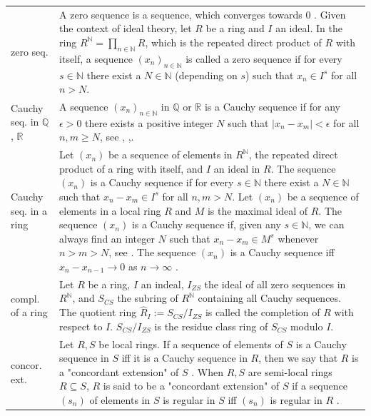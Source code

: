 \documentclass[12pt]{amsart}
\theoremstyle{definition}
\begin{document}
{\renewcommand{\arraystretch}{1.8}
\begin{table}[H]
	\centering
	\begin{tabular}{|P{1.4cm} p{13.4cm}|}
		\hline
		zero seq. & A zero sequence is a sequence, which converges towards $0$ \cite[p.~154]{Ref_Schmidt_2007}. Given the context of ideal theory, let $R$ be a ring and $I$ an ideal. In the ring $R^\mathbb{N}=\prod_{n\in\mathbb{N}}R$, which is the repeated direct product of $R$ with itself, a sequence $(x_n)_{n\in\mathbb{N}}$ is called a zero sequence if for every $s\in\mathbb{N}$ there exist a $N\in\mathbb{N}$ (depending on $s$) such that $x_n\in I^s$ for all $n>N$.
		\\
		Cauchy seq. in $\mathbb{Q}$, $\mathbb{R}$ & A sequence $(x_n)_{n\in\mathbb{N}}$ in $\mathbb{Q}$ or $\mathbb{R}$ is a Cauchy sequence if for any $\epsilon>0$ there exists a positive integer $N$ such that $|x_n-x_m|<\epsilon$ for all $n,m\ge N$, see \cite[p.~153]{Ref_Schmidt_2007}, \cite[p.~24]{Ref_Higham_2015},\cite[p.~10]{Ref_Koblitz_1984}.
		\\
		Cauchy seq. in a ring & Let $(x_n)$ be a sequence of elements in $R^\mathbb{N}$, the repeated direct product of a ring with itself, and $I$ an ideal in $R$. The sequence $(x_n)$ is a Cauchy sequence if for every $s\in\mathbb{N}$ there exist a $N\in\mathbb{N}$ such that $x_n-x_m\in I^s$ for all $n,m>N$. Let $(x_n)$ be a sequence of elements in a local ring $R$ and $M$ is the maximal ideal of $R$. The sequence $(x_n)$ is a Cauchy sequence if, given any $s\in\mathbb{N}$, we can always find an integer $N$ such that $x_n-x_m\in M^s$ whenever $n>m>N$, see \cite[p.~63, 85]{Ref_Northcott_1953}. The sequence $(x_n)$ is a Cauchy sequence iff $x_n-x_{n-1}\rightarrow0$ as $n\rightarrow\infty$ \cite[p.~85]{Ref_Northcott_1953}.
		\\
		compl. of a ring & Let $R$ be a ring, $I$ an indeal, $I_{ZS}$ the ideal of all zero sequences in $R^\mathbb{N}$, and $S_{CS}$ the subring of $R^\mathbb{N}$ containing all Cauchy sequences. The quotient ring $\hat R_I:=S_{CS}/I_{ZS}$ is called the completion of $R$ with respect to $I$. $S_{CS}/I_{ZS}$ is the residue class ring of $S_{CS}$ modulo $I$.
		\\
		concor. ext. & Let $R,S$ be local rings. If a sequence of elements of $S$ is a Cauchy sequence in $S$ iff it is a Cauchy sequence in $R$, then we say that $R$ is a "concordant extension" of $S$ \cite[p.~87]{Ref_Northcott_1953}. When $R,S$ are semi-local rings $R\subseteq S$, $R$ is said to be a "concordant extension" of $S$ if a sequence $(s_n)$ of elements in $S$ is regular in $S$ iff $(s_n)$ is regular in $R$ \cite{Ref_Batho_1959}.

\end{tabular}
\end{table}}
\end{document}

